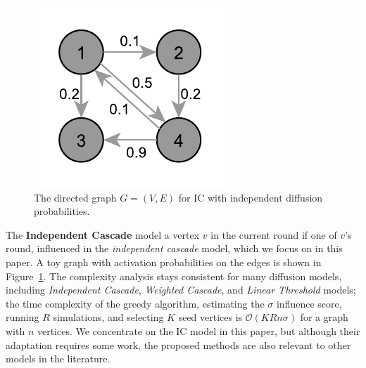 \begin{figure}
    \begin{center}
      \includegraphics[width=1\linewidth]{images/ic.pdf}
    \end{center}
    \caption{\label{fig:ic}The directed graph $G = (V, E)$ for IC with independent diffusion probabilities.}
  \end{figure}
  The {\bf Independent Cascade} model  a vertex $v$ in the current round if one of $v$'s  round,  influenced  in the {\em independent cascade} model, which we focus on in this paper. A toy graph with activation probabilities on the edges is shown in Figure~\ref{fig:ic}.
The complexity analysis stays consistent for many diffusion models, including {\em Independent Cascade}, {\em Weighted Cascade}, and {\em Linear Threshold} models; the time complexity of the greedy algorithm, estimating the $\sigma$ influence score, running $R$ simulations, and selecting $K$ seed vertices is $\mathcal{O}(KRn\sigma)$ for a graph with $n$ vertices. 
We concentrate on the IC model in this paper, but although their adaptation requires some work, the proposed methods are also relevant to other models in the literature.

